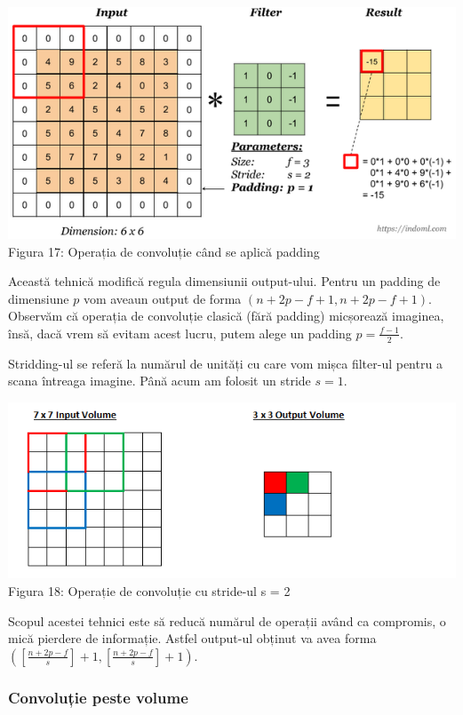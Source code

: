 \begin{center}
\includegraphics[scale=0.7]{padding}
Figura 17: Operația de convoluție când se aplică padding
\end{center}

Această tehnică modifică regula dimensiunii output-ului. Pentru un padding de dimensiune $p$ vom aveaun output de forma $(n+2p-f+1, n+2p-f+1)$. Observăm că operația de convoluție clasică (fără padding) micșorează imaginea, însă, dacă vrem să evitam acest lucru, putem alege un padding $\displaystyle{p=\frac{f-1}{2}}$.

Stridding-ul se referă la numărul de unități cu care vom mișca filter-ul pentru a scana întreaga imagine. Până acum am folosit un stride $s=1$.

\begin{center}
\includegraphics[scale=1]{stride} \\
Figura 18: Operație de convoluție cu stride-ul s = 2
\end{center}

Scopul acestei tehnici este să reducă numărul de operații având ca compromis, o mică pierdere de informație. Astfel output-ul obținut va avea forma $\displaystyle{\left(\displaystyle{\left[\frac{n+2p-f}{s}\right]}+1, \displaystyle{\left[\frac{n+2p-f}{s}\right]}+1\right)}$.

\subsubsection{Convoluție peste volume}


